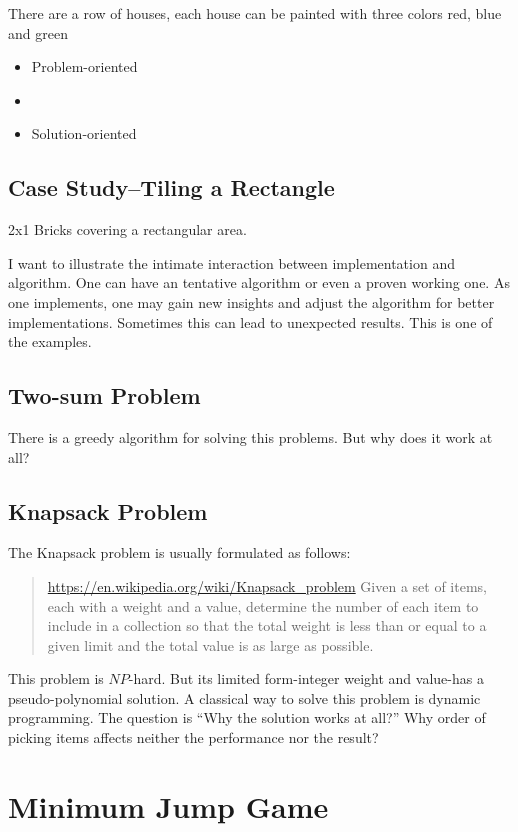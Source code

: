 \documentclass[oneside,11pt]{book}
\theoremstyle{definition}
\theoremstyle{remark}
\begin{document}
There are a row of houses, each house can be painted with three colors red, blue and green
\label{Evernote:Paint House (I and II)}
\begin{itemize}
    \item Problem-oriented\label{Evernote:Split "bothearthandsaturnspin" into words word break wordbreak}
    \item \item Solution-oriented
\end{itemize}

\section{Case Study--Tiling a Rectangle} \label{sec:tiling-rectangle}
\label{Evernote:2x1 brick paving problem tiling}
2x1 Bricks covering a rectangular area.

I want to illustrate the intimate interaction between implementation and algorithm.
One can have an tentative algorithm or even a proven working one.
As one implements, one may gain new insights and adjust the algorithm for better implementations.
Sometimes this can lead to unexpected results.
This is one of the examples.

\section{Two-sum Problem}

There is a greedy algorithm for solving this problems. But why does it work at all?

\section{Knapsack Problem}

The Knapsack problem is usually formulated as follows:
\begin{quote}
    \url{https://en.wikipedia.org/wiki/Knapsack_problem}
    Given a set of items, each with a weight and a value, determine the number of each item to
    include in a collection so that the total weight is less than or equal to a given limit and the
    total value is as large as possible.
\end{quote}

This problem is $NP$-hard.
But its limited form-integer weight and value-has a pseudo-polynomial solution.
A classical way to solve this problem is dynamic programming.
The question is ``Why the solution works at all?''
Why order of picking items affects neither the performance nor the result?
\clearpage{}
    \clearpage{}\chapter{Minimum Jump Game}\label{ch:minimumjumpgame}
\end{document}
